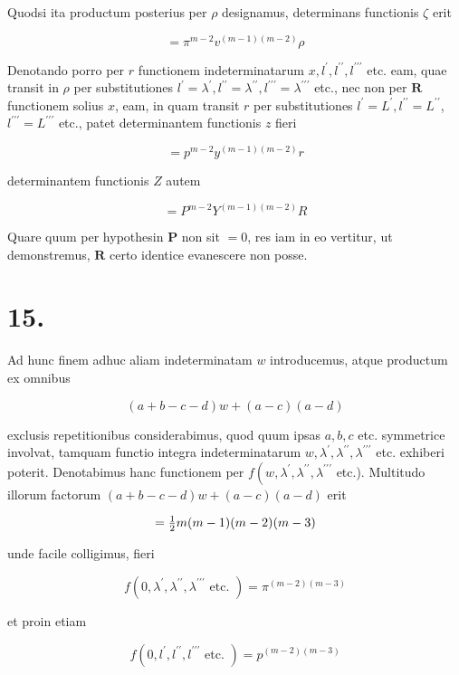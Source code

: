 \documentclass[twoside,12pt, showframe]{memoir}
\let\oldfrac\frac
\def\frac#1#2{\mathchoice{\tfrac{#1}{#2}}{\oldfrac{#1}{#2}}{\genfrac{}{}{}{2}{#1}{#2\mathstrut}}{\genfrac{}{}{}{3}{#1}{#2\mathstrut}}}
\begin{document}
Quodsi ita productum posterius per \(\rho\) designamus, determinans functionis \(\zeta\) erit

\[
=\pi^{m-2} v^{(m-1)(m-2)} \rho
\]

Denotando porro per \(r\) functionem indeterminatarum \(x, l^{\prime}, l^{\prime \prime}, l^{\prime \prime \prime}\) etc. eam, quae transit in \(\rho\) per substitutiones \(l^{\prime}=\lambda^{\prime}, l^{\prime \prime}=\lambda^{\prime \prime}, l^{\prime \prime \prime}=\lambda^{\prime \prime \prime}\) etc., nec non per \(\boldsymbol{R}\)
functionem solius \(x\), eam, in quam transit \(r\) per substitutiones \(l^{\prime}=L^{\prime}, l^{\prime \prime}=L^{\prime \prime}\), \(l^{\prime \prime \prime}=L^{\prime \prime \prime}\) etc., patet determinantem functionis \(z\) fieri

\[
=p^{m-2} y^{(m-1)(m-2)} r
\]

determinantem functionis \(Z\) autem

\[
=P^{m-2} Y^{(m-1)(m-2)} R
\]

Quare quum per hypothesin \(\boldsymbol{P}\) non sit \(=0\), res iam in eo vertitur, ut demonstremus, \(\boldsymbol{R}\) certo identice evanescere non posse.

\section*{15.}
Ad hunc finem adhuc aliam indeterminatam \(w\) introducemus, atque productum ex omnibus

\[
(a+b-c-d) w+(a-c)(a-d)
\]

exclusis repetitionibus considerabimus, quod quum ipsas \(a, b, c\) etc. symmetrice involvat, tamquam functio integra indeterminatarum \(w, \lambda^{\prime}, \lambda^{\prime \prime}, \lambda^{\prime \prime \prime}\) etc. exhiberi poterit. Denotabimus hanc functionem per \(f\left(w, \lambda^{\prime}, \lambda^{\prime \prime}, \lambda^{\prime \prime \prime}\right.\) etc.). Multitudo illorum factorum \((a+b-c-d) w+(a-c)(a-d)\) erit

\[
=\frac{1}{2} m(m-1)(m-2)(m-3)
\]

unde facile colligimus, fieri

\[
f\left(0, \lambda^{\prime}, \lambda^{\prime \prime}, \lambda^{\prime \prime \prime} \text { etc. }\right)=\pi^{(m-2)(m-3)}
\]

et proin etiam

\[
f\left(0, l^{\prime}, l^{\prime \prime}, l^{\prime \prime \prime} \text { etc. }\right)=p^{(m-2)(m-3)}
\]
\end{document}
